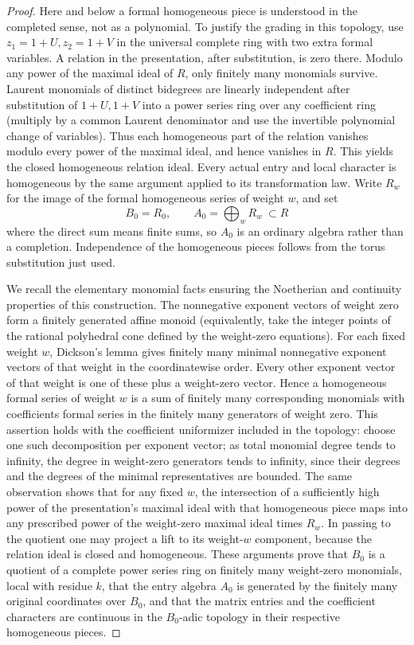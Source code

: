 \begin{proof}
Here and below a formal homogeneous piece is understood in
the completed sense, not as a polynomial. To justify the
grading in this topology, use $z_1=1+U,z_2=1+V$ in the
universal complete ring with two extra formal variables.
A relation in the presentation, after substitution, is zero
there. Modulo any power of the maximal ideal of $R$, only
finitely many monomials survive. Laurent monomials of
distinct bidegrees are linearly independent after substitution
of $1+U,1+V$ into a power series ring over any coefficient
ring (multiply by a common Laurent denominator and use
the invertible polynomial change of variables). Thus each
homogeneous part of the relation vanishes modulo every
power of the maximal ideal, and hence vanishes in $R$.
This yields the closed homogeneous relation ideal. Every
actual entry and local character is homogeneous by the same
argument applied to its transformation law. Write $R_w$ for
the image of the formal homogeneous series of weight $w$,
and set
\[
                 B_0=R_0,\qquad A_0=\bigoplus_{w}R_w
                    \ \subset R
\]
where the direct sum means finite sums, so $A_0$ is an
ordinary algebra rather than a completion. Independence
of the homogeneous pieces follows from the torus
substitution just used.

We recall the elementary monomial facts ensuring the
Noetherian and continuity properties of this construction.
The nonnegative exponent vectors of weight zero form a
finitely generated affine monoid (equivalently, take the
integer points of the rational polyhedral cone defined by
the weight-zero equations). For each fixed weight $w$,
Dickson's lemma gives finitely many minimal nonnegative
exponent vectors of that weight in the coordinatewise
order. Every other exponent vector of that weight is
one of these plus a weight-zero vector. Hence a homogeneous
formal series of weight $w$ is a sum of finitely many
corresponding monomials with coefficients formal series in
the finitely many generators of weight zero. This assertion
holds with the coefficient uniformizer included in the
topology: choose one such decomposition per exponent
vector; as total monomial degree tends to infinity, the
degree in weight-zero generators tends to infinity, since
their degrees and the degrees of the minimal representatives
are bounded. The same observation shows that for any
fixed $w$, the intersection of a sufficiently high power
of the presentation's maximal ideal with that homogeneous
piece maps into any prescribed power of the weight-zero
maximal ideal times $R_w$. In passing to the quotient one
may project a lift to its weight-$w$ component, because the
relation ideal is closed and homogeneous. These arguments
prove that $B_0$ is a quotient of a complete power series
ring on finitely many weight-zero monomials, local with
residue $k$, that the entry algebra $A_0$ is generated by
the finitely many original coordinates over $B_0$, and
that the matrix entries and the coefficient characters
are continuous in the $B_0$-adic topology in their
respective homogeneous pieces.


\end{proof}
